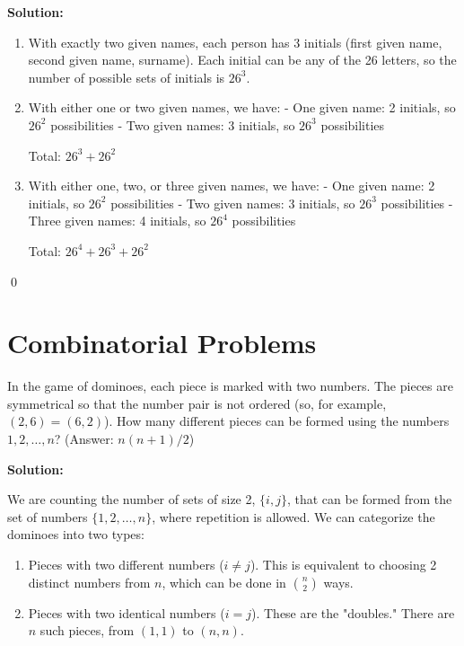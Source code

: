 \noindent\textbf{Solution:}
\begin{enumerate}[label=(\alph*)]
    \item With exactly two given names, each person has 3 initials (first given name, second given name, surname). Each initial can be any of the 26 letters, so the number of possible sets of initials is $26^3$.
    
    \item With either one or two given names, we have:
    - One given name: 2 initials, so $26^2$ possibilities
    - Two given names: 3 initials, so $26^3$ possibilities
    
    Total: $26^3 + 26^2$
    
    \item With either one, two, or three given names, we have:
    - One given name: 2 initials, so $26^2$ possibilities
    - Two given names: 3 initials, so $26^3$ possibilities
    - Three given names: 4 initials, so $26^4$ possibilities
    
    Total: $26^4 + 26^3 + 26^2$
\end{enumerate}



\qed
\section{Combinatorial Problems}

\begin{problembox}
In the game of dominoes, each piece is marked with two numbers. The pieces are symmetrical so that the number pair is not ordered (so, for example, $(2,6)=(6,2)$). How many different pieces can be formed using the numbers $1,2,\ldots,n$?
(Answer: $n(n+1)/2$)
\end{problembox}

\noindent\textbf{Solution:}

We are counting the number of sets of size 2, $\{i, j\}$, that can be formed from the set of numbers $\{1, 2, \ldots, n\}$, where repetition is allowed. We can categorize the dominoes into two types:

\begin{enumerate}
    \item Pieces with two different numbers ($i \neq j$). This is equivalent to choosing 2 distinct numbers from $n$, which can be done in $\binom{n}{2}$ ways.
    \item Pieces with two identical numbers ($i = j$). These are the "doubles." There are $n$ such pieces, from $(1,1)$ to $(n,n)$.
\end{enumerate}

